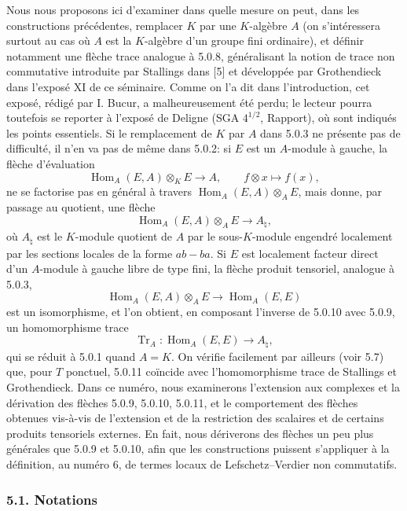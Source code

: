 \documentclass[11pt]{article}
\DeclareMathOperator{\Hom}{Hom}
\providecommand{\Tr}{\operatorname{Tr}}
\providecommand{\Tr}{\operatorname{Tr}}
\providecommand{\Tr}{\operatorname{Tr}}
\providecommand{\Hom}{\operatorname{Hom}}
\begin{document}
Nous nous proposons ici d'examiner dans quelle mesure on peut, dans les constructions précédentes, remplacer $K$ par une $K$-algèbre $A$ (on s'intéressera surtout au cas où $A$ est la $K$-algèbre d'un groupe fini ordinaire), et définir notamment une flèche trace analogue à 5.0.8, généralisant la notion de trace non commutative introduite par Stallings dans [5] et développée par Grothendieck dans l'exposé XI de ce séminaire. Comme on l'a dit dans l'introduction, cet exposé, rédigé par I. Bucur, a malheureusement été perdu; le lecteur pourra toutefois se reporter à l'exposé de Deligne (SGA $4^{1/2}$, Rapport), où sont indiqués les points essentiels. Si le remplacement de $K$ par $A$ dans 5.0.3 ne présente pas de difficulté, il n'en va pas de même dans 5.0.2: si $E$ est un $A$-module à gauche, la flèche d'évaluation
\[
\Hom_A(E,A)\otimes_KE\longrightarrow A,
\qquad f\otimes x\longmapsto f(x),
\]
ne se factorise pas en général à travers $\Hom_A(E,A)\otimes_AE$, mais donne, par passage au quotient, une flèche
\begin{equation}\tag{5.0.9}
\Hom_A(E,A)\otimes_AE\longrightarrow A_\natural,
\end{equation}
où $A_\natural$ est le $K$-module quotient de $A$ par le sous-$K$-module engendré localement par les sections locales de la forme $ab-ba$. Si $E$ est localement facteur direct d'un $A$-module à gauche libre de type fini, la flèche produit tensoriel, analogue à 5.0.3,
\begin{equation}\tag{5.0.10}
\Hom_A(E,A)\otimes_AE\longrightarrow\Hom_A(E,E)
\end{equation}
est un isomorphisme, et l'on obtient, en composant l'inverse de 5.0.10 avec 5.0.9, un homomorphisme trace
\begin{equation}\tag{5.0.11}
\Tr_A:\Hom_A(E,E)\longrightarrow A_\natural,
\end{equation}
qui se réduit à 5.0.1 quand $A=K$. On vérifie facilement par ailleurs (voir 5.7) que, pour $T$ ponctuel, 5.0.11 coïncide avec l'homomorphisme trace de Stallings et Grothendieck. Dans ce numéro, nous examinerons l'extension aux complexes et la dérivation des flèches 5.0.9, 5.0.10, 5.0.11, et le comportement des flèches obtenues vis-à-vis de l'extension et de la restriction des scalaires et de certains produits tensoriels externes. En fait, nous dériverons des flèches un peu plus générales que 5.0.9 et 5.0.10, afin que les constructions puissent s'appliquer à la définition, au numéro 6, de termes locaux de Lefschetz--Verdier non commutatifs.

\subsubsection*{5.1. Notations}
\end{document}
